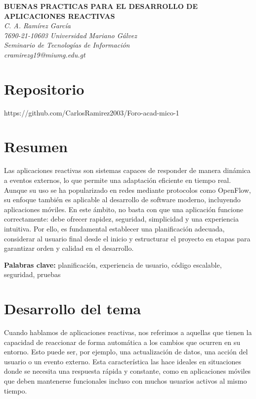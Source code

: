 \documentclass[12pt,letterpaper]{article}
\begin{document}
\begin{center}
    \textbf{\uppercase{BUENAS PRACTICAS PARA EL DESARROLLO DE APLICACIONES REACTIVAS}}\\[1ex]
    \textit{C. A. Ramírez García} \\
    \textit{7690-21-10603  Universidad Mariano Gálvez} \\
    \textit{Seminario de Tecnologías de Información} \\
    \textit{cramirezg19@miumg.edu.gt}
\end{center}

\section*{Repositorio}
https://github.com/CarlosRamirez2003/Foro-acad-mico-1

\section*{Resumen}
Las aplicaciones reactivas son sistemas capaces de responder de manera dinámica a eventos externos, lo que permite una adaptación eficiente en tiempo real. Aunque su uso se ha popularizado en redes mediante protocolos como OpenFlow, su enfoque también es aplicable al desarrollo de software moderno, incluyendo aplicaciones móviles. En este ámbito, no basta con que una aplicación funcione correctamente: debe ofrecer rapidez, seguridad, simplicidad y una experiencia intuitiva. Por ello, es fundamental establecer una planificación adecuada, considerar al usuario final desde el inicio y estructurar el proyecto en etapas para garantizar orden y calidad en el desarrollo.


\textbf{Palabras clave:} planificación, experiencia de usuario, código escalable, seguridad, pruebas

\section*{Desarrollo del tema}
Cuando hablamos de aplicaciones reactivas, nos referimos a aquellas que tienen la capacidad de reaccionar de forma automática a los cambios que ocurren en su entorno. Esto puede ser, por ejemplo, una actualización de datos, una acción del usuario o un evento externo. Esta característica las hace ideales en situaciones donde se necesita una respuesta rápida y constante, como en aplicaciones móviles que deben mantenerse funcionales incluso con muchos usuarios activos al mismo tiempo.
\end{document}
